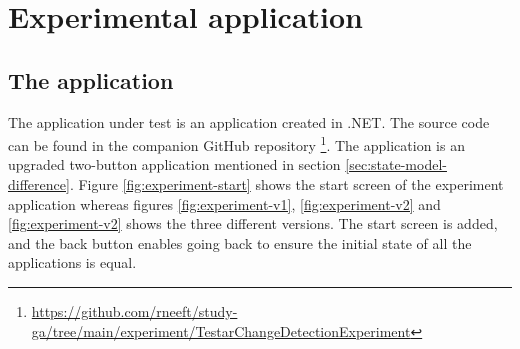 \section{Experimental application} \label{sec:experimental-application}

\subsection{The application}

The application under test is an application created in .NET. The source code can be found in the companion GitHub repository \footnote{\url{https://github.com/rneeft/study-ga/tree/main/experiment/TestarChangeDetectionExperiment}}. The application is an upgraded two-button application mentioned in section \ref{sec:state-model-difference}. Figure \ref{fig:experiment-start} shows the start screen of the experiment application whereas figures \ref{fig:experiment-v1}, \ref{fig:experiment-v2} and \ref{fig:experiment-v2}  shows the three different versions. The start screen is added, and the back button enables going back to ensure the initial state of all the applications is equal. 

